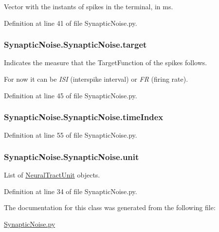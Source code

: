 Vector with the instants of spikes in the terminal, in ms. 



Definition at line 41 of file Synaptic\+Noise.\+py.

\subsubsection[{\texorpdfstring{target}{target}}]{\setlength{\rightskip}{0pt plus 5cm}Synaptic\+Noise.\+Synaptic\+Noise.\+target}\hypertarget{class_synaptic_noise_1_1_synaptic_noise_a682fd860345b62be1d93bedb0a02c436}{}\label{class_synaptic_noise_1_1_synaptic_noise_a682fd860345b62be1d93bedb0a02c436}


Indicates the measure that the Target\+Function of the spikes follows. 

For now it can be {\itshape I\+SI} (interspike interval) or {\itshape FR} (firing rate). 

Definition at line 45 of file Synaptic\+Noise.\+py.

\subsubsection[{\texorpdfstring{time\+Index}{timeIndex}}]{\setlength{\rightskip}{0pt plus 5cm}Synaptic\+Noise.\+Synaptic\+Noise.\+time\+Index}\hypertarget{class_synaptic_noise_1_1_synaptic_noise_a064f195dbf5eadb3bbe43e6a6d8d6cec}{}\label{class_synaptic_noise_1_1_synaptic_noise_a064f195dbf5eadb3bbe43e6a6d8d6cec}


Definition at line 55 of file Synaptic\+Noise.\+py.

\subsubsection[{\texorpdfstring{unit}{unit}}]{\setlength{\rightskip}{0pt plus 5cm}Synaptic\+Noise.\+Synaptic\+Noise.\+unit}\hypertarget{class_synaptic_noise_1_1_synaptic_noise_ac29255d1f6d1d7e1a86fb18de3c3ab4b}{}\label{class_synaptic_noise_1_1_synaptic_noise_ac29255d1f6d1d7e1a86fb18de3c3ab4b}


List of \hyperlink{namespace_neural_tract_unit}{Neural\+Tract\+Unit} objects. 



Definition at line 34 of file Synaptic\+Noise.\+py.



The documentation for this class was generated from the following file\+:\begin{DoxyCompactItemize}
\item 
\hyperlink{_synaptic_noise_8py}{Synaptic\+Noise.\+py}\end{DoxyCompactItemize}

